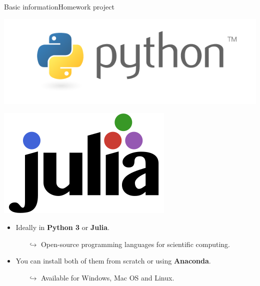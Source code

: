 \documentclass[usenames,dvipsnames,svgnames,10pt,aspectratio=169]{beamer}
\begin{document}
\begin{frame}[t, c]{Basic information}{Homework project}
	\begin{minipage}{.28\textwidth}
		\centering
		\includegraphics[height=.15\textheight]{python_logo}

		\bigskip

		\includegraphics[height=.15\textheight]{julia_logo}
	\end{minipage}%
	\hfill
	\begin{minipage}{.68\textwidth}
		\begin{itemize}
			\item Ideally in \alert{\textbf{Python 3}} or \alert{\textbf{Julia}}.
			\begin{itemize}
				\item[\( \hookrightarrow \)] Open-source programming languages for scientific computing.
			\end{itemize}

			\bigskip

			\item You can install both of them from scratch or using \alert{\textbf{Anaconda}}.
			\begin{itemize}
				\item[\( \hookrightarrow \)] Available for Windows, Mac OS and Linux.
			\end{itemize}

		\end{itemize}
	\end{minipage}

	\vspace{1cm}
\end{frame}
\end{document}
